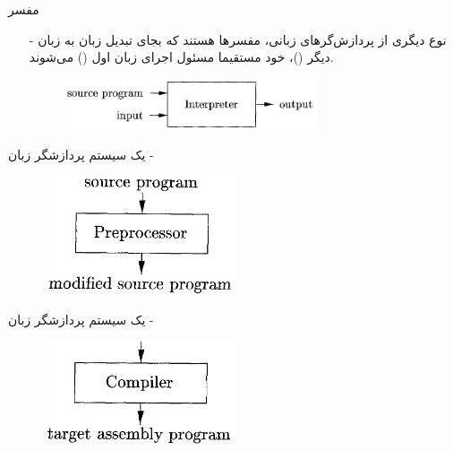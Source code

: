 \begin{frame}{مفسر}
\begin{itemize}\itemr
\item[-]
نوع دیگری از پردازش‌گر‌های زبانی، مفسرها هستند که بجای تبدیل زبان به زبان دیگر ()، خود مستقیما مسئول اجرای زبان اول () می‌شوند.
\vspace{5mm}
\begin{figure}[H]
\begin{center}
\includegraphics[width=0.7\textwidth, height=0.3\textheight, angle=0]{docs/images/interpreter}
\end{center}
\end{figure}
\end{itemize}
\end{frame}

\begin{frame}{یک سیستم پردازشگر زبان - }
\begin{figure}[H]
\begin{center}
\includegraphics[width=0.5\textwidth, height=0.5\textheight, angle=0.6]{docs/images/preprocessor}
\end{center}
\end{figure}
\end{frame}

\begin{frame}{یک سیستم پردازشگر زبان - }
\begin{figure}[H]
\begin{center}
\includegraphics[width=0.5\textwidth, height=0.5\textheight, angle=0.6]{docs/images/compiler}
\end{center}
\end{figure}
\end{frame}

